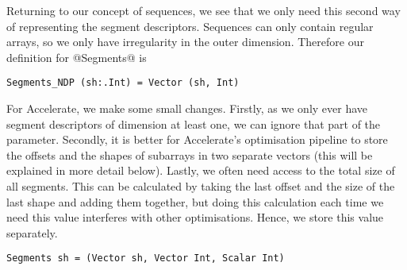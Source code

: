 Returning to our concept of sequences, we see that we only need this second way of representing the segment descriptors. Sequences can only contain regular arrays, so we only have irregularity in the outer dimension. Therefore our definition for @Segments@ is
%
\begin{lstlisting}[style=ndp]
Segments_NDP (sh:.Int) = Vector (sh, Int)
\end{lstlisting}
%
For Accelerate, we make some small changes. Firstly, as we only ever have segment descriptors of dimension at least one, we can ignore that part of the parameter. Secondly, it is better for Accelerate's optimisation pipeline to store the offsets and the shapes of subarrays in two separate vectors (this will be explained in more detail below). Lastly, we often need access to the total size of all segments. This can be calculated by taking the last offset and the size of the last shape and adding them together, but doing this calculation each time we need this value interferes with other optimisations. Hence, we store this value separately.
%
\begin{lstlisting}[style=ndp]
Segments sh = (Vector sh, Vector Int, Scalar Int)
\end{lstlisting}
%




%
%

